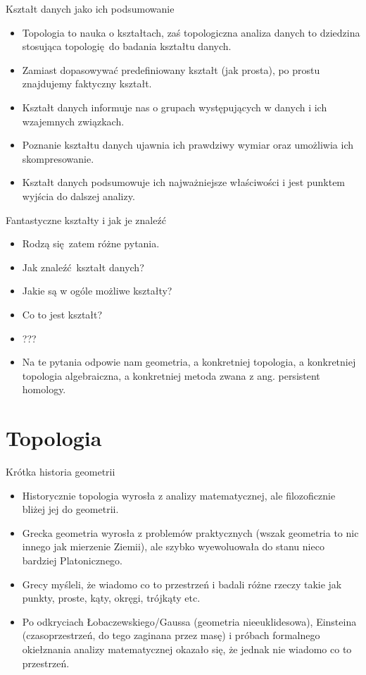 \documentclass{beamer}
\begin{document}
\begin{frame}{Kształt danych jako ich podsumowanie}
\begin{itemize}
	\item Topologia to nauka o kształtach, zaś topologiczna analiza danych to dziedzina stosująca topologię do badania kształtu danych.
	\item Zamiast dopasowywać predefiniowany kształt (jak prosta), po prostu znajdujemy faktyczny kształt.
	\item Kształt danych informuje nas o grupach występujących w danych i ich wzajemnych związkach.
	\item Poznanie kształtu danych ujawnia ich prawdziwy wymiar oraz umożliwia ich skompresowanie.
	\item Kształt danych podsumowuje ich najważniejsze właściwości i jest punktem wyjścia do dalszej analizy.
\end{itemize}
\end{frame}

\begin{frame}{Fantastyczne kształty i jak je znaleźć}
\begin{itemize}
	\item Rodzą się zatem różne pytania.
	\item Jak znaleźć kształt danych?
	\item Jakie są w ogóle możliwe kształty?
	\item Co to jest kształt?
	\item ???
	\item Na te pytania odpowie nam geometria, a konkretniej topologia, a konkretniej topologia algebraiczna, a konkretniej metoda zwana z ang. persistent homology.
\end{itemize}
\end{frame}

\section{Topologia}

\begin{frame}{Krótka historia geometrii}
\begin{itemize}
	\item Historycznie topologia wyrosła z analizy matematycznej, ale filozoficznie bliżej jej do geometrii.
	\item Grecka geometria wyrosła z problemów praktycznych (wszak geometria to nic innego jak mierzenie Ziemii), ale szybko wyewoluowała do stanu nieco bardziej Platonicznego.
	\item Grecy myśleli, że wiadomo co to przestrzeń i badali różne rzeczy takie jak punkty, proste, kąty, okręgi, trójkąty etc.
	\item Po odkryciach Łobaczewskiego/Gaussa (geometria nieeuklidesowa), Einsteina (czasoprzestrzeń, do tego zaginana przez masę) i próbach formalnego okiełznania analizy matematycznej okazało się, że jednak nie wiadomo co to przestrzeń.
\end{itemize}
\end{frame}
\end{document}
